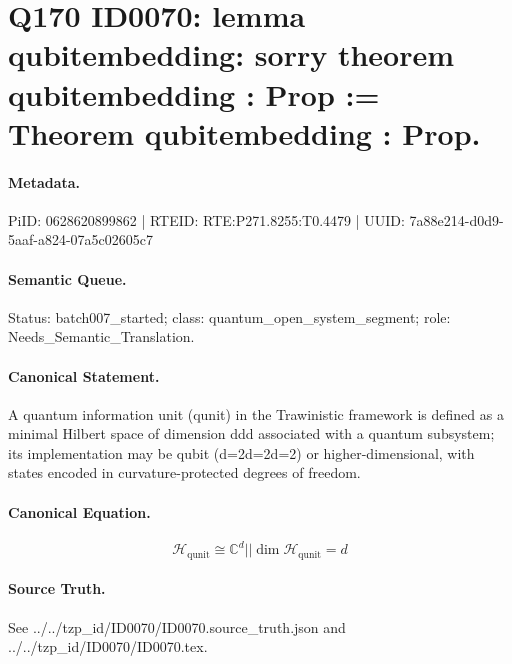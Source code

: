 \section*{Q170 ID0070: lemma qubitembedding: sorry theorem qubitembedding : Prop := Theorem qubitembedding : Prop.}
\paragraph{Metadata.}
PiID: 0628620899862 | RTEID: RTE:P271.8255:T0.4479 | UUID: 7a88e214-d0d9-5aaf-a824-07a5c02605c7

\paragraph{Semantic Queue.}
Status: batch007\_started; class: quantum\_open\_system\_segment; role: Needs\_Semantic\_Translation.

\paragraph{Canonical Statement.}
A quantum information unit (qunit) in the Trawinistic framework is defined as a minimal Hilbert space of dimension ddd associated with a quantum subsystem; its implementation may be qubit (d=2d=2d=2) or higher-dimensional, with states encoded in curvature-protected degrees of freedom.

\paragraph{Canonical Equation.}
\[
\mathcal{H}_{\mathrm{qunit}} \cong \mathbb{C}^{d} || \dim \mathcal{H}_{\mathrm{qunit}} = d
\]

\paragraph{Source Truth.}
See ../../tzp\_id/ID0070/ID0070.source\_truth.json and ../../tzp\_id/ID0070/ID0070.tex.
